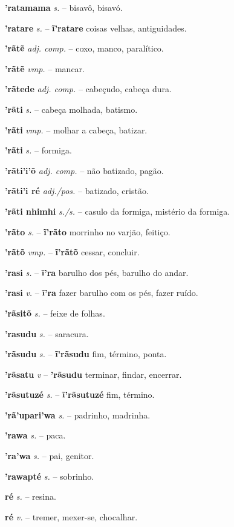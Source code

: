 \textbf{'ratamama} \textit{s.} -- bisavô, bisavó.

\textbf{'ratare} \textit{s.} -- \textbf{ĩ'ratare} coisas velhas, antiguidades.

\textbf{'rãtẽ} \textit{adj. comp.} -- coxo, manco, paralítico.

\textbf{'rãtẽ} \textit{vmp.} -- mancar.

\textbf{'rãtede} \textit{adj. comp.} -- cabeçudo, cabeça dura.

\textbf{'rãti} \textit{s.} -- cabeça molhada, batismo.

\textbf{'rãti} \textit{vmp.} -- molhar a cabeça, batizar.

\textbf{'rãti} \textit{s.} -- formiga.

\textbf{'rãti'i'õ} \textit{adj. comp.} -- não batizado, pagão.

\textbf{'rãti'i ré} \textit{adj./pos.} -- batizado, cristão.

\textbf{'rãti nhimhi} \textit{s./s.} -- casulo da formiga, mistério da formiga.

\textbf{'rãto} \textit{s.} -- \textbf{ĩ'rãto} morrinho no varjão, feitiço.

\textbf{'rãtõ} \textit{vmp.} -- \textbf{ĩ'rãtõ} cessar, concluir.

\textbf{'rasi} \textit{s.} -- \textbf{ĩ'ra} barulho dos pés, barulho do andar.

\textbf{'rasi} \textit{v.} -- \textbf{ĩ'ra} fazer barulho com os pés, fazer ruído.

\textbf{'rãsitõ} \textit{s.} -- feixe de folhas.

\textbf{'rasudu} \textit{s.} -- saracura.

\textbf{'rãsudu} \textit{s.} -- \textbf{ĩ'rãsudu} fim, término, ponta.

\textbf{'rãsatu} \textit{v} -- \textbf{'rãsudu} terminar, findar, encerrar.

\textbf{'rãsutuzé} \textit{s.} -- \textbf{ĩ'rãsutuzé} fim, término.

\textbf{'rã'upari'wa} \textit{s.} -- padrinho, madrinha.

\textbf{'rawa} \textit{s.} -- paca.

\textbf{'ra'wa} \textit{s.} -- pai, genitor.

\textbf{'rawapté} \textit{s.} -- sobrinho.

\textbf{ré} \textit{s.} -- resina.

\textbf{ré} \textit{v.} -- tremer, mexer-se, chocalhar.

